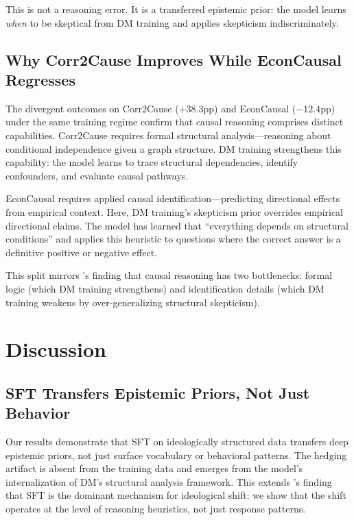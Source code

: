 \documentclass{article}
\begin{document}
This is not a reasoning error. It is a transferred epistemic prior: the model learns \textit{when} to be skeptical from DM training and applies skepticism indiscriminately.

\subsection{Why Corr2Cause Improves While EconCausal Regresses}

The divergent outcomes on Corr2Cause ($+38.3$pp) and EconCausal ($-12.4$pp) under the same training regime confirm that causal reasoning comprises distinct capabilities. Corr2Cause requires formal structural analysis---reasoning about conditional independence given a graph structure. DM training strengthens this capability: the model learns to trace structural dependencies, identify confounders, and evaluate causal pathways.

EconCausal requires applied causal identification---predicting directional effects from empirical context. Here, DM training's skepticism prior overrides empirical directional claims. The model has learned that ``everything depends on structural conditions'' and applies this heuristic to questions where the correct answer is a definitive positive or negative effect.

This split mirrors \citet{syrgkanis2026causalreasoning}'s finding that causal reasoning has two bottlenecks: formal logic (which DM training strengthens) and identification details (which DM training weakens by over-generalizing structural skepticism).

\section{Discussion}

\subsection{SFT Transfers Epistemic Priors, Not Just Behavior}

Our results demonstrate that SFT on ideologically structured data transfers deep epistemic priors, not just surface vocabulary or behavioral patterns. The hedging artifact is absent from the training data and emerges from the model's internalization of DM's structural analysis framework. This extends \citet{kronlund2024propaganda}'s finding that SFT is the dominant mechanism for ideological shift: we show that the shift operates at the level of reasoning heuristics, not just response patterns.
\end{document}
